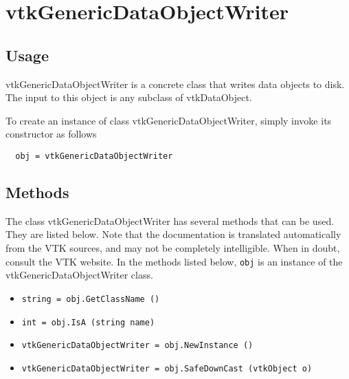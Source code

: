 \section{vtkGenericDataObjectWriter}

\subsection{Usage}

 vtkGenericDataObjectWriter is a concrete class that writes data objects
 to disk. The input to this object is any subclass of vtkDataObject.

To create an instance of class vtkGenericDataObjectWriter, simply
invoke its constructor as follows
\begin{verbatim}
  obj = vtkGenericDataObjectWriter
\end{verbatim}
\subsection{Methods}

The class vtkGenericDataObjectWriter has several methods that can be used.
  They are listed below.
Note that the documentation is translated automatically from the VTK sources,
and may not be completely intelligible.  When in doubt, consult the VTK website.
In the methods listed below, \verb|obj| is an instance of the vtkGenericDataObjectWriter class.
\begin{itemize}
\item  \verb|string = obj.GetClassName ()|

\item  \verb|int = obj.IsA (string name)|

\item  \verb|vtkGenericDataObjectWriter = obj.NewInstance ()|

\item  \verb|vtkGenericDataObjectWriter = obj.SafeDownCast (vtkObject o)|

\end{itemize}
